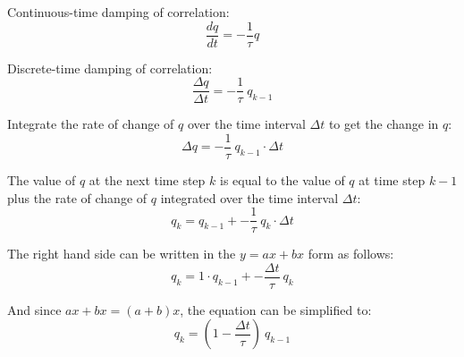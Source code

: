 Continuous-time damping of correlation:
\begin{equation}
\frac{dq}{dt} = - \frac{1}{\tau} q
\end{equation}


Discrete-time damping of correlation:
\begin{equation}
\frac{\Delta{}q}{\Delta{}t} = - \frac{1}{\tau}\:q_{k-1}
\end{equation}


Integrate the rate of change of $q$ over the time interval $\Delta{}t$ to get the change in $q$:
\begin{equation}
\Delta{}q = - \frac{1}{\tau}\:q_{k-1} \cdot{} \Delta{}t
\end{equation}

The value of $q$ at the next time step $k$ is equal to the value of $q$ at time step $k-1$ plus the rate of change of $q$ integrated over the time interval $\Delta{}t$:
\begin{equation}
q_{k} = q_{k-1} + - \frac{1}{\tau}\:q_{k} \cdot{} \Delta{}t
\end{equation}

The right hand side can be written in the $y = ax+bx$ form as follows:
\begin{equation}
q_{k} = 1 \cdot{} q_{k-1} + - \frac{\Delta{}t}{\tau}\:q_{k}
\end{equation}

And since $ax+bx = (a+b)x$, the equation can be simplified to:
\begin{equation}
q_{k} = (1 - \frac{\Delta{}t}{\tau})\:q_{k-1}
\end{equation}


